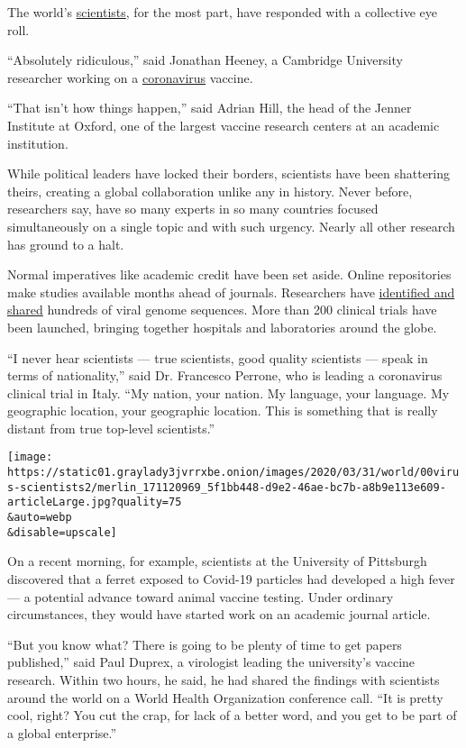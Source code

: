 The world's
\href{https://www.nytimes3xbfgragh.onion/2020/04/14/science/coronavirus-preprint-servers.html}{scientists},
for the most part, have responded with a collective eye roll.

``Absolutely ridiculous,'' said Jonathan Heeney, a Cambridge University
researcher working on a
\href{https://www.nytimes3xbfgragh.onion/2020/04/14/science/coronavirus-preprint-servers.html}{coronavirus}
vaccine.

``That isn't how things happen,'' said Adrian Hill, the head of the
Jenner Institute at Oxford, one of the largest vaccine research centers
at an academic institution.

While political leaders have locked their borders, scientists have been
shattering theirs, creating a global collaboration unlike any in
history. Never before, researchers say, have so many experts in so many
countries focused simultaneously on a single topic and with such
urgency. Nearly all other research has ground to a halt.

Normal imperatives like academic credit have been set aside. Online
repositories make studies available months ahead of journals.
Researchers have \href{https://www.gisaid.org/}{identified and shared}
hundreds of viral genome sequences. More than 200 clinical trials have
been launched, bringing together hospitals and laboratories around the
globe.

``I never hear scientists --- true scientists, good quality scientists
--- speak in terms of nationality,'' said Dr. Francesco Perrone, who is
leading a coronavirus clinical trial in Italy. ``My nation, your nation.
My language, your language. My geographic location, your geographic
location. This is something that is really distant from true top-level
scientists.''

\texttt{[image: https://static01.graylady3jvrrxbe.onion/images/2020/03/31/world/00virus-scientists2/merlin\_171120969\_5f1bb448-d9e2-46ae-bc7b-a8b9e113e609-articleLarge.jpg?quality=75\\\&auto=webp\\\&disable=upscale]}

On a recent morning, for example, scientists at the University of
Pittsburgh discovered that a ferret exposed to Covid-19 particles had
developed a high fever --- a potential advance toward animal vaccine
testing. Under ordinary circumstances, they would have started work on
an academic journal article.

``But you know what? There is going to be plenty of time to get papers
published,'' said Paul Duprex, a virologist leading the university's
vaccine research. Within two hours, he said, he had shared the findings
with scientists around the world on a World Health Organization
conference call. ``It is pretty cool, right? You cut the crap, for lack
of a better word, and you get to be part of a global enterprise.''

